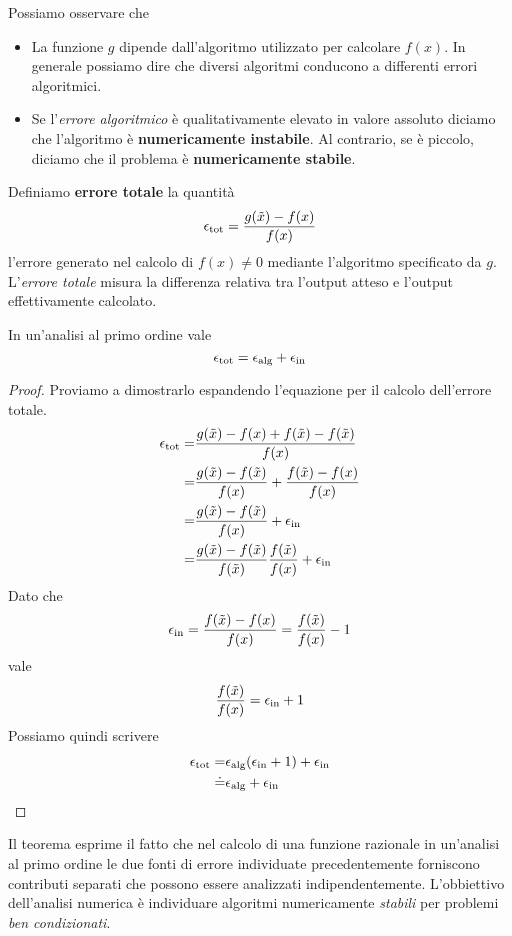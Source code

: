 \begin{observation}
	Possiamo osservare che
	\begin{itemize}
		\item La funzione $g$ dipende dall'algoritmo utilizzato per calcolare $f(x)$. In generale possiamo dire
		      che diversi algoritmi conducono a differenti errori algoritmici.
		\item Se l'\emph{errore algoritmico} è qualitativamente elevato in valore assoluto diciamo che l'algoritmo
		      è \textbf{numericamente instabile}. Al contrario, se è piccolo, diciamo che il problema è
		      \textbf{numericamente stabile}.
	\end{itemize}
\end{observation}

\begin{definition}\label{def: errore_totale}
	Definiamo \textbf{errore totale} la quantità
	\[ \epsilon_{\text{tot}} = \frac{g(\tilde{x}) - f(x)}{f(x)} \]
	l'errore generato nel calcolo di $f(x) \neq 0$ mediante l'algoritmo specificato da $g$. L'\emph{errore totale}
	misura la differenza relativa tra l'output atteso e l'output effettivamente calcolato.
\end{definition}

\begin{theorem}
	In un'analisi al primo ordine vale
	\[ \epsilon_\text{tot} = \epsilon_\text{alg} + \epsilon_\text{in} \]
	\begin{proof}
		Proviamo a dimostrarlo espandendo l'equazione per il calcolo dell'errore totale.
		\begin{align*}
			\epsilon_{\text{tot}} = & \frac{g(\tilde{x}) - f(x) + f(\tilde{x}) - f(\tilde{x})}{f(x)}              \\
			=                       & \frac{g(\tilde{x}) - f(\tilde{x})}{f(x)} + \frac{f(\tilde{x}) - f(x)}{f(x)} \\
			=                       & \frac{g(\tilde{x}) - f(\tilde{x})}{f(x)} + \epsilon_\text{in}                       \\
			=                       & \frac{g(\tilde{x}) - f(\tilde{x})}{f(\tilde{x})} \frac{f(\tilde{x})}{f(x)} + \epsilon_\text{in}
		\end{align*}
		Dato che
		\[ \epsilon_\text{in} = \frac{f(\tilde{x}) - f(x)}{f(x)} = \frac{f(\tilde{x})}{f(x)} - 1 \]
		vale
		\[ \frac{f(\tilde{x})}{f(x)} = \epsilon_\text{in} + 1 \]
		Possiamo quindi scrivere
		\begin{align*}
			\epsilon_\text{tot} = & \epsilon_\text{alg} (\epsilon_\text{in} + 1) + \epsilon_\text{in} \\
			\doteq  & \epsilon_\text{alg} + \epsilon_\text{in}
		\end{align*}
	\end{proof}
\end{theorem}

Il teorema esprime il fatto che nel calcolo di una funzione razionale in un'analisi al primo ordine le due fonti
di errore individuate precedentemente forniscono contributi separati che possono essere analizzati
indipendentemente. L'obbiettivo dell'analisi numerica è individuare algoritmi numericamente \emph{stabili} per
problemi \emph{ben condizionati}.